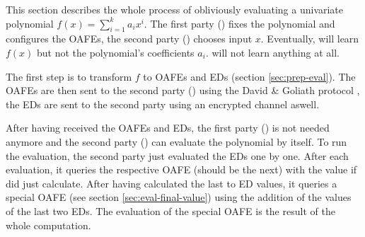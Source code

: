 %
%
\label{sec:ope}

This section describes the whole process of obliviously evaluating a univariate
polynomial $f(x) = \sum_{i=1}^k a_ix^i$. The first party (\JWpOne{}) fixes the
polynomial and configures the OAFEs, the second party (\JWpTwo{}) chooses input
$x$. Eventually, \JWpTwo{} will learn $f(x)$ but not the polynomial's
coefficients $a_i$. \JWpOne{} will not learn anything at all.

The first step is to transform $f$ to OAFEs and EDs (section
\ref{sec:prep-eval}). The OAFEs are then sent to the second party (\JWpTwo{})
using the David \& Goliath protocol \cite{davidgoliath}, the EDs are sent to the
second party using an encrypted channel aswell.

After having received the OAFEs and EDs, the first party (\JWpOne{}) is not
needed anymore and the second party (\JWpTwo{}) can evaluate the polynomial by
itself. To run the evaluation, the second party just evaluated the EDs one by
one. After each evaluation, it queries the respective OAFE (should be the next)
with the value if did just calculate. After having calculated the last to ED
values, it queries a special OAFE (see section \ref{sec:eval-final-value}) using
the addition of the values of the last two EDs. The evaluation of the special
OAFE is the result of the whole computation.

